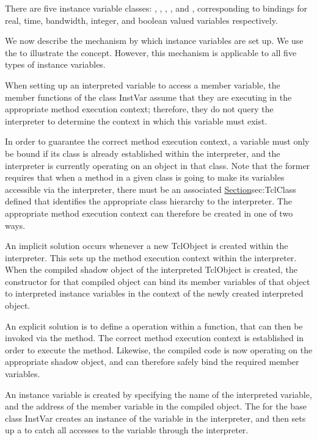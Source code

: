 There are five instance variable classes:
,
,
,
,
and ,
corresponding to bindings for real, time, bandwidth, integer, and
boolean valued variables respectively.

We now describe the mechanism by which instance variables are set up.
We use the 
to illustrate the concept.
However, this mechanism is applicable to all five types of instance variables.

When setting up an interpreted variable to access a member variable,
the member functions of the class InstVar assume that they are executing
in the appropriate method execution context;
therefore, they do not query the interpreter to determine the context in
which this variable must exist.

In order to guarantee the correct method execution context,
a variable must only be bound if its class is already established within
the interpreter, and
the interpreter is currently operating on an object in that class.
Note that the former requires that when a method in a given class is
going to make its variables accessible via the interpreter,
there must be an associated 
\href{class TclClass}{Section}{sec:TclClass}
defined that identifies the appropriate class hierarchy to the interpreter.
The appropriate method execution context can therefore be created in one
of two ways.

An implicit solution occurs whenever a new TclObject is created within
the interpreter.
This sets up the method execution context within the interpreter.
When the compiled shadow object of the interpreted TclObject is created,
the constructor for that compiled object can bind its member variables
of that object
to interpreted instance variables in the context of the newly created
interpreted object.

An explicit solution is to define a  operation
within a  function, that can then be invoked via the
 method.
The correct method execution context is established in order to execute
the  method.
Likewise, the compiled code is now operating on the appropriate
shadow object, and can therefore safely bind the required member variables.

An instance variable is created by specifying the name of the
interpreted variable, and the address of the member variable in the
compiled object.
The
for the base class InstVar 
creates an instance of the variable in the interpreter,
and then sets up a
to  catch all accesses to the variable through the interpreter.

